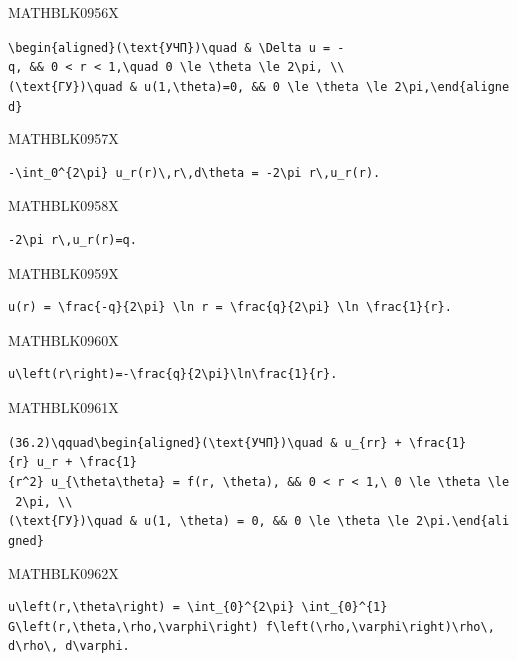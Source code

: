 \documentclass[
  ukrainian,
]{article}
\begin{document}
MATHBLK0956X

\texttt{\textbackslash{}begin\{aligned\}(\textbackslash{}text\{УЧП\})\textbackslash{}quad\ \&\ \textbackslash{}Delta\ u\ =\ -q,\ \&\&\ 0\ \textless{}\ r\ \textless{}\ 1,\textbackslash{}quad\ 0\ \textbackslash{}le\ \textbackslash{}theta\ \textbackslash{}le\ 2\textbackslash{}pi,\ \textbackslash{}\textbackslash{}(\textbackslash{}text\{ГУ\})\textbackslash{}quad\ \&\ u(1,\textbackslash{}theta)=0,\ \&\&\ 0\ \textbackslash{}le\ \textbackslash{}theta\ \textbackslash{}le\ 2\textbackslash{}pi,\textbackslash{}end\{aligned\}}

MATHBLK0957X

\begin{verbatim}
-\int_0^{2\pi} u_r(r)\,r\,d\theta = -2\pi r\,u_r(r).
\end{verbatim}

MATHBLK0958X

\begin{verbatim}
-2\pi r\,u_r(r)=q.
\end{verbatim}

MATHBLK0959X

\begin{verbatim}
u(r) = \frac{-q}{2\pi} \ln r = \frac{q}{2\pi} \ln \frac{1}{r}.
\end{verbatim}

MATHBLK0960X

\begin{verbatim}
u\left(r\right)=-\frac{q}{2\pi}\ln\frac{1}{r}.
\end{verbatim}

MATHBLK0961X

\texttt{(36.2)\textbackslash{}qquad\textbackslash{}begin\{aligned\}(\textbackslash{}text\{УЧП\})\textbackslash{}quad\ \&\ u\_\{rr\}\ +\ \textbackslash{}frac\{1\}\{r\}\ u\_r\ +\ \textbackslash{}frac\{1\}\{r\^{}2\}\ u\_\{\textbackslash{}theta\textbackslash{}theta\}\ =\ f(r,\ \textbackslash{}theta),\ \&\&\ 0\ \textless{}\ r\ \textless{}\ 1,\textbackslash{}\ 0\ \textbackslash{}le\ \textbackslash{}theta\ \textbackslash{}le\ 2\textbackslash{}pi,\ \textbackslash{}\textbackslash{}(\textbackslash{}text\{ГУ\})\textbackslash{}quad\ \&\ u(1,\ \textbackslash{}theta)\ =\ 0,\ \&\&\ 0\ \textbackslash{}le\ \textbackslash{}theta\ \textbackslash{}le\ 2\textbackslash{}pi.\textbackslash{}end\{aligned\}}

MATHBLK0962X

\begin{verbatim}
u\left(r,\theta\right) = \int_{0}^{2\pi} \int_{0}^{1} G\left(r,\theta,\rho,\varphi\right) f\left(\rho,\varphi\right)\rho\, d\rho\, d\varphi.
\end{verbatim}
\end{document}
